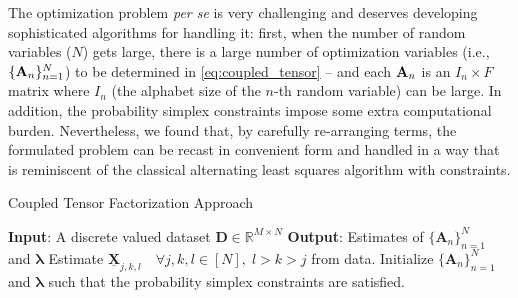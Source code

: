 \documentclass[journal]{IEEEtran}
\begin{document}
The optimization problem {\it per se} is very challenging and deserves developing sophisticated algorithms for handling it:
first, when the number of random variables ($N$) gets large, there is a large number of optimization variables (i.e., $\{{\bf A}_n\}_{n=1}^N$) to be determined in \eqref{eq:coupled_tensor} -- and each ${\bf A}_n$ is an $I_n\times F$ matrix where $I_n$ (the alphabet size of the $n$-th random variable) can be large. In addition, the probability simplex constraints impose some extra computational burden. Nevertheless, we found that, by carefully re-arranging terms, the formulated problem can be recast in convenient form and handled in a way that is reminiscent of the classical alternating least squares algorithm with constraints.
\begin{algorithm}[t]
\caption{Coupled Tensor Factorization Approach}
\begin{algorithmic}[1]
\STATEx \hspace*{-.4cm}
 \textbf{Input}: A discrete valued dataset $\mathbf{D}\in \mathbb{R}^{M \times N}$
\STATEx \hspace*{-.4cm}
\textbf{Output}: Estimates of $\{\mathbf{A}_n\}_{n=1}^N$ and $\boldsymbol{\lambda}$
\STATE Estimate $\underline{\mathbf{X}}_{j,k,l} \quad \forall j,k,l \in [N],\; l>k>j$ from data.
\STATE Initialize $\{\mathbf{A}_n\}_{n=1}^N$ and $\boldsymbol{\lambda}$ such that the probability simplex constraints are satisfied.
\REPEAT  
 \ENDFOR
\end{algorithmic}
\label{alg:coupled_tensor_approach}
\end{algorithm}
\end{document}
